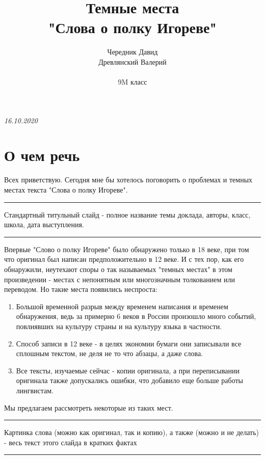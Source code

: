 \documentclass[14pt, a4paper]{article}
\title{\Huge\bfseries Темные места \\ \Huge\bfseries "Слова о полку Игореве"}
\author{\huge Чередник Давид \\ \huge Древлянский Валерий \\\\ \Large 9M класс}
\date{}
\newcommand{\descr}[1]
{\par\noindent\rule{0.5\textwidth}{0.4pt} \par {\large #1} \par\noindent\rule{0.5\textwidth}{0.4pt}}
\begin{document}
\clearpage\maketitle
\begin{center}
  \itshape 16.10.2020
\end{center}
\thispagestyle{empty}

\newpage

\tableofcontents

\newpage

{\Large

\section{О чем речь}
Всех приветствую. Сегодня мне бы хотелось поговорить о проблемах и темных местах текста "Слова о полку Игореве".
\descr{
  Стандартный титульный слайд - полное название темы доклада, авторы, класс, школа, дата выступления.}
\par Впервые "Слово о полку Игореве" было обнаружено только в 18 веке, при том что оригинал был написан предположительно в 12 веке. И с тех пор, как его обнаружили, неутехают споры о так называемых "темных местах" в этом произведении - местах с непонятным или многозначным толкованием или переводом. Но такие места появились неспроста:
\begin{enumerate}
  \item Большой временной разрыв между временем написания и временем обнаружения, ведь за примерно 6 веков в России произошло много событий, повлиявших на культуру страны и на культуру языка в частности.
  \item Способ записи в 12 веке - в целях экономии бумаги они записывали все сплошным текстом, не деля не то что абзацы, а даже слова.
  \item Все тексты, изучаемые сейчас - копии оригинала, а при переписывании оригинала также допускались ошибки, что добавило еще больше работы лингвистам.
\end{enumerate}
\par Мы предлагаем рассмотреть некоторые из таких мест.
\descr{
  Картинка слова (можно как оригинал, так и копию), а также (можно и не делать) - весь текст этого слайда в кратких фактах}

}
\end{document}
